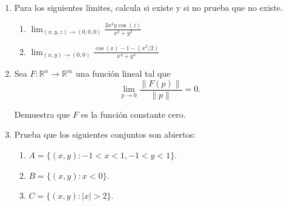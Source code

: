 \documentclass{article}
\theoremstyle{definition}
\begin{document}
\begin{enumerate}
\begin{enumerate}
	\end{enumerate}



      \item Para los siguientes l\'imites, calcula si existe y si no prueba que no existe.
        \begin{enumerate}
        \item $\lim_{(x,y,z)\to (0,0,0)} \frac{2x^2y\cos(z)}{x^2+y^2}$
          \item $\lim_{(x,y)\to (0,0)} \frac{\cos(x)-1-(x^2/2)}{x^4+y^4}$
        \end{enumerate}
    
  \item Sea $F:\mathbb{R}^n \to \mathbb{R}^m$ una funci\'on lineal tal que
    $$
    \lim_{p\to 0} \frac{\|F(p)\|}{\|p\|}=0.
    $$

    Demuestra que $F$ es la funci\'on constante cero.

  \item Prueba que los siguientes conjuntos son abiertos:
    \begin{enumerate}
    \item $A=\{(x,y): -1< x <1, -1<y <1  \}$.
  \item $B=\{(x,y): x< 0  \}$.
    \item $C=\{ (x,y): |x|>2  \}$.
    \end{enumerate}
    


  \end{enumerate}
  
  
       
\end{document}
